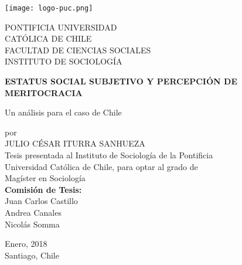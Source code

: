 				\begin{titlepage}
	\begin{center}
		\vspace*{-1in}
		
		\begin{minipage}{0.2\textwidth}%
			\texttt{[image: logo-puc.png]}
		\end{minipage}%
		\hfi
		\begin{minipage}{0.6\textwidth} 
			PONTIFICIA UNIVERSIDAD \\
			CATÓLICA DE CHILE \\
			FACULTAD DE CIENCIAS SOCIALES \\
			INSTITUTO DE SOCIOLOGÍA 
		\end{minipage}
		\vspace*{0.6in}
		
		\begin{large}
		\end{large}
		\vspace*{0.5in}
		\begin{Large}
			\textbf{ESTATUS SOCIAL SUBJETIVO Y PERCEPCIÓN DE MERITOCRACIA} \\
		\end{Large}
		\vspace*{0.15in}
		\begin{large}
			Un análisis para el caso de Chile\\
		\end{large}
		\vspace*{0.3in}
		\vspace*{0.1in}
		\begin{large}
			por \\
			\vspace*{0.1in}
			JULIO CÉSAR ITURRA SANHUEZA \\
			\vspace*{0.3in}
			Tesis presentada al Instituto de Sociología de la Pontificia \\
			Universidad Católica de Chile, para optar al grado de \\
			Magíster en Sociología \\
			
			\vspace*{0.9in}
			\textbf{Comisión de Tesis:} \\
			Juan Carlos Castillo\\
			Andrea Canales\\Nicolás Somma\\
		\end{large}
		\vspace*{0.9in}
		\begin{large}
			Enero, 2018\\
			Santiago, Chile
		\end{large}
	\end{center}
\end{titlepage}